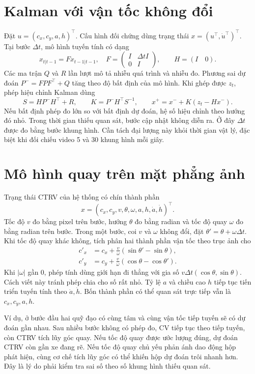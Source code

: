 \section{Kalman với vận tốc không đổi}
Đặt $u=(c_x,c_y,a,h)^\top$. Cấu hình đối chứng dùng trạng thái $x=(u^\top,\dot u^\top)^\top$. Tại bước $\Delta t$, mô hình tuyến tính có dạng
\[
 x_{t|t-1}=F x_{t-1|t-1},\quad
 F=\begin{pmatrix}I&\Delta t I\\0&I\end{pmatrix},\qquad H=(I\quad 0).
\]
Các ma trận $Q$ và $R$ lần lượt mô tả nhiễu quá trình và nhiễu đo. Phương sai dự đoán $P^- = FPF^\top+Q$ tăng theo độ bất định của mô hình. Khi ghép được $z_t$, phép hiệu chỉnh Kalman \cite{kalman} dùng
\[
 S=HP^-H^\top+R,\qquad K=P^-H^\top S^{-1},\qquad
 x^+=x^-+K(z_t-Hx^-).
\]
Nếu bất định phép đo lớn so với bất định dự đoán, hệ số hiệu chỉnh theo hướng đó nhỏ. Trong thời gian thiếu quan sát, bước cập nhật không diễn ra. Ở đây $\Delta t$ được đo bằng bước khung hình. Cần tách đại lượng này khỏi thời gian vật lý, đặc biệt khi đối chiếu video 5 và 30 khung hình mỗi giây.

\section{Mô hình quay trên mặt phẳng ảnh}
Trạng thái CTRV của hệ thống có chín thành phần
\[
 x=(c_x,c_y,v,\theta,\omega,a,h,\dot a,\dot h)^\top .
\]
Tốc độ $v$ đo bằng pixel trên bước, hướng $\theta$ đo bằng radian và tốc độ quay $\omega$ đo bằng radian trên bước. Trong một bước, coi $v$ và $\omega$ không đổi, đặt $\theta'=\theta+\omega\Delta t$. Khi tốc độ quay khác không, tích phân hai thành phần vận tốc theo trục ảnh cho
\begin{align}
 c'_x &=c_x+\frac{v}{\omega}(\sin\theta'-\sin\theta),\\
 c'_y &=c_y+\frac{v}{\omega}(\cos\theta-\cos\theta').
\end{align}
Khi $|\omega|$ gần 0, phép tính dùng giới hạn đi thẳng với gia số $v\Delta t(\cos\theta,\sin\theta)$. Cách viết này tránh phép chia cho số rất nhỏ. Tỷ lệ $a$ và chiều cao $h$ tiếp tục tiến triển tuyến tính theo $\dot a,\dot h$. Bốn thành phần có thể quan sát trực tiếp vẫn là $c_x,c_y,a,h$.

Ví dụ, ở bước đầu hai quỹ đạo có cùng tâm và cùng vận tốc tiếp tuyến sẽ có dự đoán gần nhau. Sau nhiều bước không có phép đo, CV tiếp tục theo tiếp tuyến, còn CTRV tích lũy góc quay. Nếu tốc độ quay được ước lượng đúng, dự đoán CTRV còn gần xe đang rẽ. Nếu tốc độ quay chủ yếu phản ánh dao động hộp phát hiện, cùng cơ chế tích lũy góc có thể khiến hộp dự đoán trôi nhanh hơn. Đây là lý do phải kiểm tra sai số theo số khung hình thiếu quan sát.

